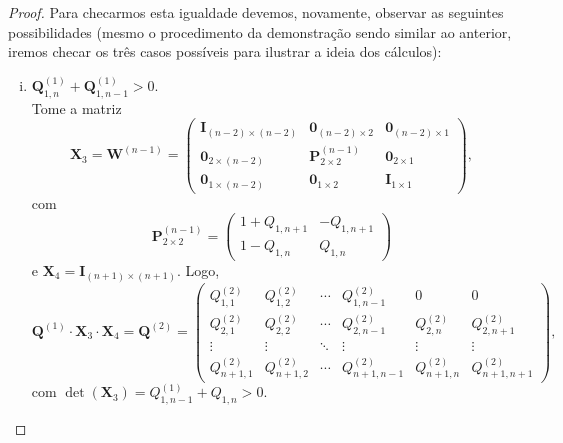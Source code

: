 \documentclass[twoside,openright,titlepage,numbers=noenddot,headinclude,  lineheaders footinclude=true,cleardoublepage=empty,
                                BCOR=5mm,paper=a4,fontsize=12pt ]{scrbook}
\theoremstyle{definition}
\begin{document}
\begin{proof}
Para checarmos esta igualdade devemos, novamente,
 observar as seguintes
possibilidades (mesmo o procedimento da demonstração sendo similar ao anterior, iremos
checar os três casos possíveis para ilustrar a ideia dos cálculos):
\begin{enumerate}[(i)]
\item  $\mathbf{Q}^{(1)}_{1,n} + \mathbf{Q}^{(1)}_{1,n-1} > 0$. 
\hfill \\
Tome a matriz %
\[
\mathbf{X}_3 = 
\mathbf{W}^{(n-1)} = 
\begin{pmatrix}
\mathbf{I}_{(n-2)\times (n-2)}& \mathbf{0}_{(n-2) \times 2} &
\mathbf{0}_{(n-2) \times 1} \\
\mathbf{0}_{2 \times (n-2)} & \mathbf{P}^{(n-1)}_{2 \times 2} &
 \mathbf{0}_{2 \times 1}\\
\mathbf{0}_{1 \times (n-2)} & \mathbf{0}_{1 \times 2}
 & \mathbf{I}_{1\times 1}
\end{pmatrix}
,
\]
com 
\[
\mathbf{P}^{(n-1)}_{2 \times 2}
=
\begin{pmatrix}
1 + Q_{1, n+1} & -Q_{1, n+1} \\
1 - Q_{1,n}    & Q_{1,n}
\end{pmatrix}
\]
e $\bm{X}_4 = \bm{I}_{(n+1) \times (n+1)}$.
Logo,
\[
\bm{Q}^{(1)} \cdot \bm{X}_3 \cdot \bm{X}_4 =
\mathbf{Q}^{(2)} = 
\begin{pmatrix}
Q^{(2)}_{1,1} & Q^{(2)}_{1,2} & \cdots & Q^{(2)}_{1,n-1} & 0&0\\
Q^{(2)}_{2,1} & Q^{(2)}_{2,2} & \cdots & Q^{(2)}_{2,n-1}&
 Q^{(2)}_{2,n}&
Q^{(2)}_{2,n+1}\\
\vdots & \vdots & \ddots & \vdots & \vdots & \vdots \\
Q^{(2)}_{n+1,1} & Q^{(2)}_{n+1,2} & \cdots & Q^{(2)}_{n+1,n-1}&
 Q^{(2)}_{n+1,n} &
Q^{(2)}_{n+1,n+1}
\end{pmatrix}
,
\]
com $\det(\mathbf{X}_3) = Q^{(1)}_{1,n-1} + Q_{1, n} > 0$.


\end{enumerate}
\end{proof}
\end{document}
